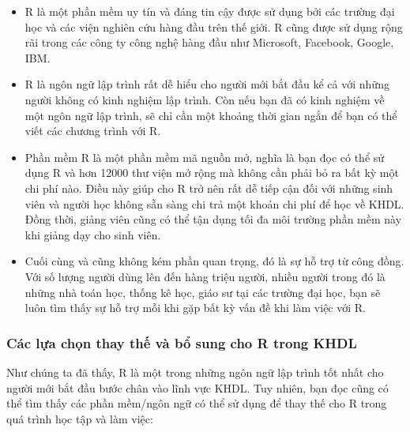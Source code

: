 \documentclass[
]{article}
\begin{document}
\begin{itemize}
\item
  R là một phần mềm uy tín và đáng tin cậy được sử dụng bởi các trường đại học và các viện nghiên cứu hàng đầu trên thế giới. R cũng được sử dụng rộng rãi trong các công ty công nghệ hàng đầu như Microsoft, Facebook, Google, IBM.
\item
  R là ngôn ngữ lập trình rất dễ hiểu cho người mới bắt đầu kể cả với những người không có kinh nghiệm lập trình. Còn nếu bạn đã có kinh nghiệm về một ngôn ngữ lập trình, sẽ chỉ cần một khoảng thời gian ngắn để bạn có thể viết các chương trình với R.
\item
  Phần mềm R là một phần mềm mã nguồn mở, nghĩa là bạn đọc có thể sử dụng R và hơn 12000 thư viện mở rộng mà không cần phải bỏ ra bất kỳ một chi phí nào. Điều này giúp cho R trở nên rất dễ tiếp cận đối với những sinh viên và người học không sẵn sàng chi trả một khoản chi phí để học về KHDL. Đồng thời, giảng viên cũng có thể tận dụng tối đa môi trường phần mềm này khi giảng dạy cho sinh viên.
\item
  Cuối cùng và cũng không kém phần quan trọng, đó là sự hỗ trợ từ công đồng. Với số lượng người dùng lên đến hàng triệu người, nhiều người trong đó là những nhà toán học, thống kê học, giáo sư tại các trường đại học, bạn sẽ luôn tìm thấy sự hỗ trợ mỗi khi gặp bất kỳ vấn đề khi làm việc với R.
\end{itemize}

\hypertarget{cuxe1c-lux1ef1a-chux1ecdn-thay-thux1ebf-vuxe0-bux1ed5-sung-cho-r-trong-khdl}{%
\subsubsection{Các lựa chọn thay thế và bổ sung cho R trong KHDL}\label{cuxe1c-lux1ef1a-chux1ecdn-thay-thux1ebf-vuxe0-bux1ed5-sung-cho-r-trong-khdl}}

Như chúng ta đã thấy, R là một trong những ngôn ngữ lập trình tốt nhất cho người mới bắt đầu bước chân vào lĩnh vực KHDL. Tuy nhiên, bạn đọc cũng có thể tìm thấy các phần mềm/ngôn ngữ có thể sử dụng để thay thế cho R trong quá trình học tập và làm việc:
\end{document}
